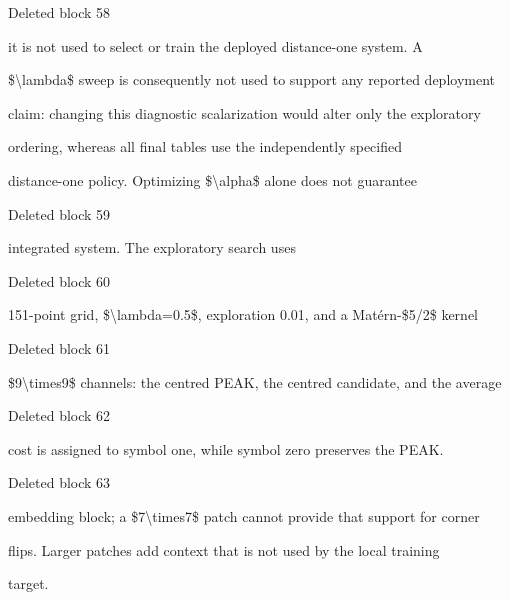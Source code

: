 \documentclass[a4paper,fleqn]{cas-dc}
\newenvironment{RevisionDeletion}{%
  \par\begingroup\color{revisionred}\footnotesize\ttfamily
  \setlength{\parindent}{0pt}\setlength{\parskip}{1pt}\obeyspaces
}{\par\endgroup}
\begin{document}
\begin{RevisionDeletion}
Deleted block 58\par
it is not used to select or train the deployed distance-one system. A\par
\$\textbackslash{}lambda\$ sweep is consequently not used to support any reported deployment\par
claim: changing this diagnostic scalarization would alter only the exploratory\par
ordering, whereas all final tables use the independently specified\par
distance-one policy. Optimizing \$\textbackslash{}alpha\$ alone does not guarantee\par
\end{RevisionDeletion}

\begin{RevisionDeletion}
Deleted block 59\par
integrated system. The exploratory search uses\par
\end{RevisionDeletion}

\begin{RevisionDeletion}
Deleted block 60\par
151-point grid, \$\textbackslash{}lambda=0.5\$, exploration 0.01, and a Matérn-\$5/2\$ kernel\par
\end{RevisionDeletion}

\begin{RevisionDeletion}
Deleted block 61\par
\$9\textbackslash{}times9\$ channels: the centred PEAK, the centred candidate, and the average\par
\end{RevisionDeletion}

\begin{RevisionDeletion}
Deleted block 62\par
cost is assigned to symbol one, while symbol zero preserves the PEAK.\par
\end{RevisionDeletion}

\begin{RevisionDeletion}
Deleted block 63\par
embedding block; a \$7\textbackslash{}times7\$ patch cannot provide that support for corner\par
flips. Larger patches add context that is not used by the local training\par
target.\par
\end{RevisionDeletion}
\end{document}
